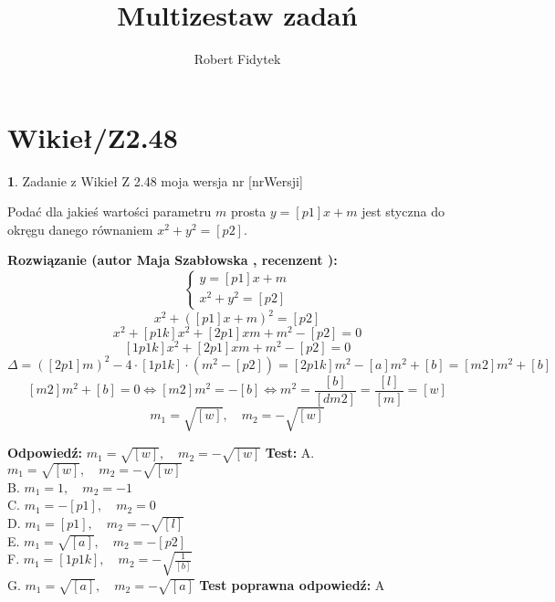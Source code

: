 \documentclass[12pt, a4paper]{article}
\title{Multizestaw zadań}
\author{Robert Fidytek}
\date{}
\theoremstyle{definition} %
\newtheorem{zad}{}
\newcommand{\kategoria}[1]{\section{#1}} %
\newcommand{\zadStart}[1]{\begin{zad}#1\newline} %
\newcommand{\zadStop}{\end{zad}}   %
\newcommand{\rozwStart}[2]{\noindent \textbf{Rozwiązanie (autor #1 , recenzent #2): }\newline} %
\newcommand{\rozwStop}{\newline}                                            %
\newcommand{\odpStart}{\noindent \textbf{Odpowiedź:}\newline}    %
\newcommand{\odpStop}{\newline}                                             %
\newcommand{\testStart}{\noindent \textbf{Test:}\newline} %
\newcommand{\testStop}{\newline} %
\newcommand{\kluczStart}{\noindent \textbf{Test poprawna odpowiedź:}\newline} %
\newcommand{\kluczStop}{\newline} %
\begin{document}
\maketitle


\kategoria{Wikieł/Z2.48}
\zadStart{Zadanie z Wikieł Z 2.48 moja wersja nr [nrWersji]}


Podać dla jakieś wartości parametru $m$ prosta $y=[p1]x+m$ jest styczna do okręgu danego równaniem $x^{2}+y^{2}=[p2].$

\zadStop

\rozwStart{Maja Szabłowska}{}
$$ \left\{ \begin{array}{ll}
y=[p1]x+m \\
x^{2}+y^{2}=[p2]
\end{array} \right.$$
$$x^{2}+([p1]x+m)^{2}=[p2]$$
$$x^{2}+[p1k]x^{2}+[2p1]xm+m^{2}-[p2]=0$$
$$[1p1k]x^{2}+[2p1]xm+m^{2}-[p2]=0$$
$$\Delta=([2p1]m)^{2}-4\cdot[1p1k]\cdot(m^{2}-[p2])=[2p1k]m^{2}-[a]m^{2}+[b]=[m2]m^{2}+[b]$$
$$[m2]m^{2}+[b]=0 \iff [m2]m^{2}=-[b] \iff m^{2}=\frac{[b]}{[dm2]}=\frac{[l]}{[m]}=[w]$$
$$m_{1}=\sqrt{[w]}, \quad m_{2}=-\sqrt{[w]}$$
\rozwStop


\odpStart
$m_{1}=\sqrt{[w]}, \quad m_{2}=-\sqrt{[w]}$
\odpStop
\testStart
A. $m_{1}=\sqrt{[w]}, \quad m_{2}=-\sqrt{[w]}$\\
B. $m_{1}=1, \quad m_{2}=-1$\\
C. $m_{1}=-[p1], \quad m_{2}=0$\\
D. $m_{1}=[p1], \quad m_{2}=-\sqrt{[l]}$\\
E. $m_{1}=\sqrt{[a]}, \quad m_{2}=-[p2]$\\
F. $m_{1}=[1p1k], \quad m_{2}=-\sqrt{\frac{1}{[b]}}$\\
G. $m_{1}=\sqrt{[a]}, \quad m_{2}=-\sqrt{[a]}$
\testStop
\kluczStart
A
\kluczStop
\end{document}
